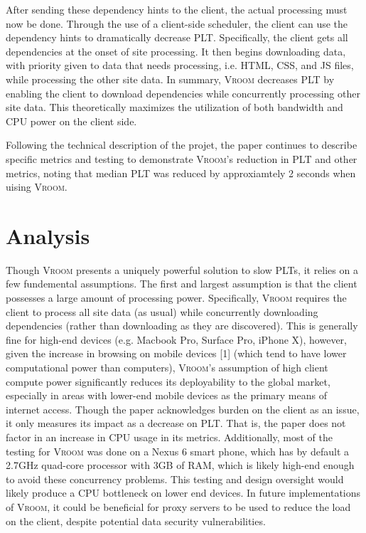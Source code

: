 \documentclass[10pt,letterpaper]{article}
\begin{document}
\begin{multicols*}{2}[]
			After sending these dependency hints to the client, the actual processing must now be done. Through the use of a client-side scheduler, the client can use the dependency hints to dramatically decrease PLT. Specifically, the client gets all dependencies at the onset of site processing. It then begins downloading data, with priority given to data that needs processing, i.e. HTML, CSS, and JS files, while processing the other site data. In summary, \textsc{Vroom} decreases PLT by enabling the client to download dependencies while concurrently processing other site data. This theoretically maximizes the utilization of both bandwidth and CPU power on the client side.

            Following the technical description of the projet, the paper continues to describe specific metrics and testing to demonstrate \textsc{Vroom}'s reduction in PLT and other metrics, noting that median PLT was reduced by approxiamtely 2 seconds when uising \textsc{Vroom}.
			\section{Analysis}
                Though \textsc{Vroom} presents a uniquely powerful solution to slow PLTs, it relies on a few fundemental assumptions. The first and largest assumption is that the client possesses a large amount of processing power. Specifically, \textsc{Vroom} requires the client to process all site data (as usual) while concurrently downloading dependencies (rather than downloading as they are discovered). This is generally fine for high-end devices (e.g. Macbook Pro, Surface Pro, iPhone X), however, given the increase in browsing on mobile devices [1] (which tend to have lower computational power than computers), \textsc{Vroom}'s assumption of high client compute power significantly reduces its deployability to the global market, especially in areas with lower-end mobile devices as the primary means of internet access. Though the paper acknowledges burden on the client as an issue, it only measures its impact as a decrease on PLT. That is, the paper does not factor in an increase in CPU usage in its metrics. Additionally, most of the testing for \textsc{Vroom} was done on a Nexus 6 smart phone, which has by default a 2.7GHz quad-core processor with 3GB of RAM, which is likely high-end enough to avoid these concurrency problems. This testing and design oversight would likely produce a CPU bottleneck on lower end devices. In future implementations of \textsc{Vroom}, it could be beneficial for proxy servers to be used to reduce the load on the client, despite potential data security vulnerabilities.


\end{multicols*}
\end{document}
